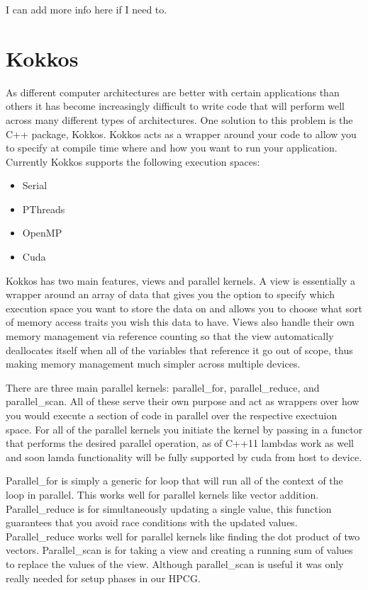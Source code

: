 \documentclass{ccr15}
\begin{document}
I can add more info here if I need to.

\section{Kokkos}
As different computer architectures are better with certain applications than others it has
become increasingly difficult to write code that will perform well across many different types of
architectures. One solution to this problem is the C++ package, Kokkos. Kokkos acts as a wrapper
around your code to allow you to specify at compile time where and how you want to run your
application. Currently Kokkos supports the following execution spaces:
\begin{itemize}
	\item Serial
	\item PThreads
	\item OpenMP
	\item Cuda
\end{itemize}

Kokkos has two main features, views and parallel kernels. A view is essentially a wrapper around
an array of data that gives you the option to specify which execution space you want to store the
data on and allows you to choose what sort of memory access traits you wish this data to have.
Views also handle their own memory management via reference counting so that the view
automatically deallocates itself when all of the variables that reference it go out of scope,
thus making memory management much simpler across multiple devices.

There are three main parallel kernels: parallel\_for, parallel\_reduce, and parallel\_scan. All 
of these serve their own purpose and act as wrappers over how you would execute a section of 
code in parallel over the respective exectuion space. For all of the parallel kernels you 
initiate the kernel by passing in a functor that performs the desired parallel operation, as of 
C++11 lambdas work as well and soon lamda functionality will be fully supported by cuda from 
host to device.

Parallel\_for is simply a generic for loop that will run all of the context of the loop in
parallel. This works well for parallel kernels like vector addition. Parallel\_reduce is for 
simultaneously updating a single value, this function guarantees that you avoid race conditions 
with the updated values. Parallel\_reduce works well for parallel kernels like finding the dot
product of two vectors. Parallel\_scan is for taking a view and creating a running sum of values
to replace the values of the view. Although parallel\_scan is useful it was only really needed
for setup phases in our HPCG.
\end{document}
